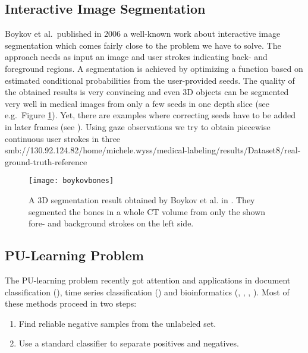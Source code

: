 \subsection{Interactive Image Segmentation}
Boykov et al.\ published in 2006 a well-known work \cite{boykov2006graph} about interactive image segmentation which comes fairly close to the problem we have to solve. 
The approach needs as input an image and user strokes indicating back- and foreground regions. 
A segmentation is achieved by optimizing a function based on estimated conditional probabilities from the user-provided seeds. 
The quality of the obtained results is very convincing and even 3D objects can be segmented very well in medical images from only a few seeds in one depth slice (see e.g.\ Figure \ref{fig:boykovbones}). 
Yet, there are examples where correcting seeds have to be added in later frames (see \cite[Section~Experimental Results]{boykov2006graph}). 
Using gaze observations we try to obtain piecewise continuous user strokes in three smb://130.92.124.82/home/michele.wyss/medical-labeling/results/Dataset8/real-ground-truth-reference%

\begin{figure}[ht]
	\centering
	\texttt{[image: boykovbones]}
	\caption{A 3D segmentation result obtained by Boykov et al. in \cite{boykov2006graph}. They segmented the bones in a whole CT volume from only the shown fore- and background strokes on the left side.}
	\label{fig:boykovbones}
\end{figure}

\subsection{PU-Learning Problem}
The PU-learning problem recently got attention and applications in document classification (\cite{li2003learning}), time series classification (\cite{nguyen2011positive}) and bioinformatics (\cite{elkan2008learning}, \cite{yang2012positive}, \cite{yang2014ensemble}, \cite{yousef2015novel}). 
Most of these methods proceed in two steps: 
\begin{enumerate}
 \item Find reliable negative samples from the unlabeled set.
 \item Use a standard classifier to separate positives and negatives.
\end{enumerate}

